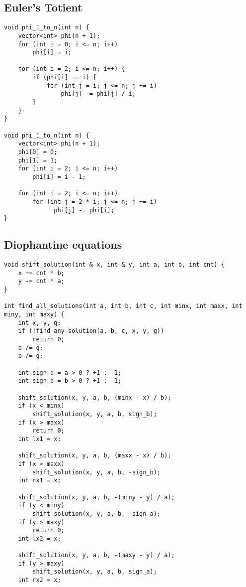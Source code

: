 \documentclass[10pt]{article}
\begin{document}
\begin{multicols*}{2}
\begin{lstlisting}[style=compactcpp]
\end{lstlisting}


\subsection{Euler's Totient}

\begin{lstlisting}[style=compactcpp]
void phi_1_to_n(int n) {
    vector<int> phi(n + 1);
    for (int i = 0; i <= n; i++)
        phi[i] = i;

    for (int i = 2; i <= n; i++) {
        if (phi[i] == i) {
            for (int j = i; j <= n; j += i)
                phi[j] -= phi[j] / i;
        }
    }
}

void phi_1_to_n(int n) {
    vector<int> phi(n + 1);
    phi[0] = 0;
    phi[1] = 1;
    for (int i = 2; i <= n; i++)
        phi[i] = i - 1;

    for (int i = 2; i <= n; i++)
        for (int j = 2 * i; j <= n; j += i)
              phi[j] -= phi[i];
}
\end{lstlisting}

\subsection{Diophantine equations}

\begin{lstlisting}[style=compactcpp]
void shift_solution(int & x, int & y, int a, int b, int cnt) {
    x += cnt * b;
    y -= cnt * a;
}

int find_all_solutions(int a, int b, int c, int minx, int maxx, int miny, int maxy) {
    int x, y, g;
    if (!find_any_solution(a, b, c, x, y, g))
        return 0;
    a /= g;
    b /= g;

    int sign_a = a > 0 ? +1 : -1;
    int sign_b = b > 0 ? +1 : -1;

    shift_solution(x, y, a, b, (minx - x) / b);
    if (x < minx)
        shift_solution(x, y, a, b, sign_b);
    if (x > maxx)
        return 0;
    int lx1 = x;

    shift_solution(x, y, a, b, (maxx - x) / b);
    if (x > maxx)
        shift_solution(x, y, a, b, -sign_b);
    int rx1 = x;

    shift_solution(x, y, a, b, -(miny - y) / a);
    if (y < miny)
        shift_solution(x, y, a, b, -sign_a);
    if (y > maxy)
        return 0;
    int lx2 = x;

    shift_solution(x, y, a, b, -(maxy - y) / a);
    if (y > maxy)
        shift_solution(x, y, a, b, sign_a);
    int rx2 = x;


\end{lstlisting}
\end{multicols*}
\end{document}

